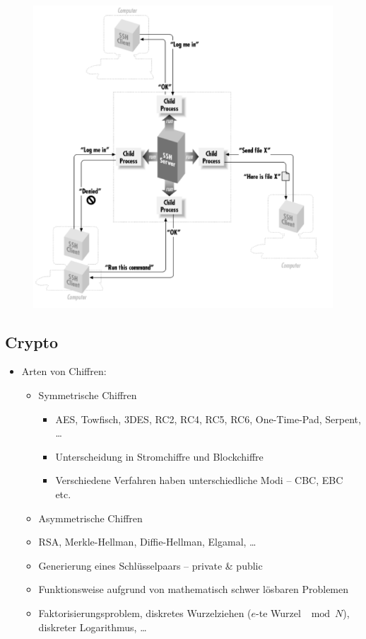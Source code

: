 \documentclass[xcolor=dvipsnames]{beamer}
\begin{document}
\begin{frame}
\begin{figure}
\center
\includegraphics[scale=0.25]{ssh2}
\end{figure}
\end{frame}

\subsection{Crypto}
\begin{frame}{}
\begin{itemize}
	\item Arten von Chiffren:
	\begin{itemize}
		\item Symmetrische Chiffren
		\begin{itemize}
			\item AES, Towfisch, 3DES, RC2, RC4, RC5, RC6, One-Time-Pad, Serpent, \dots
			\item Unterscheidung in Stromchiffre und Blockchiffre
			\item Verschiedene Verfahren haben unterschiedliche Modi -- CBC, EBC etc.
		\end{itemize}
		\item Asymmetrische Chiffren
			\item RSA, Merkle-Hellman, Diffie-Hellman, Elgamal, \dots
			\item Generierung eines Schlüsselpaars -- private \& public
			\item Funktionsweise aufgrund von mathematisch schwer lösbaren Problemen
			\item Faktorisierungsproblem, diskretes Wurzelziehen ($e$-te Wurzel $\mod N$), diskreter Logarithmus, \dots
	\end{itemize}
\end{itemize}
\end{frame}
\end{document}

